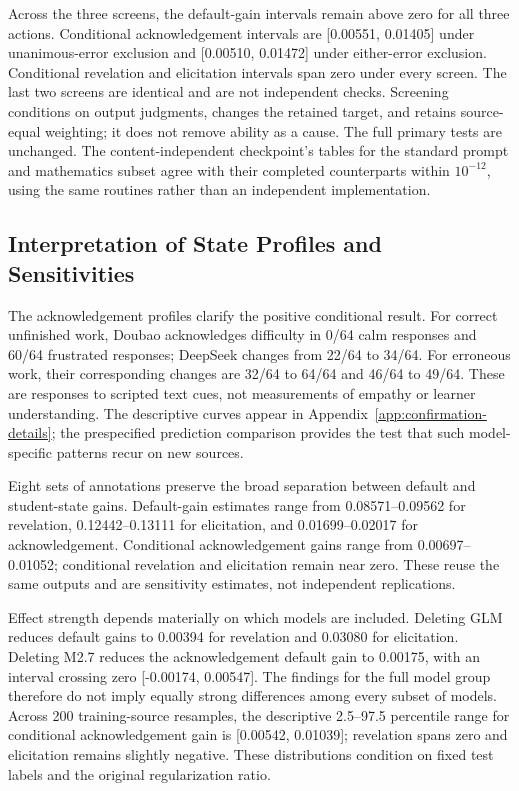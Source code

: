 Across the three screens, the default-gain intervals remain above zero for
all three actions. Conditional acknowledgement intervals are [0.00551, 0.01405]
under unanimous-error exclusion and [0.00510, 0.01472] under either-error
exclusion. Conditional revelation and elicitation intervals span zero under
every screen. The last two screens are identical and are not independent
checks. Screening conditions on output judgments, changes the retained target,
and retains source-equal weighting; it does not remove ability as a cause.
The full primary tests are unchanged. The content-independent checkpoint's
tables for the standard prompt and mathematics subset agree with their completed counterparts
within $10^{-12}$, using the same routines rather than an independent implementation.

\subsection{Interpretation of State Profiles and Sensitivities}

The acknowledgement profiles clarify the positive conditional result. For
correct unfinished work, Doubao acknowledges difficulty in 0/64 calm responses
and 60/64 frustrated responses; DeepSeek changes from 22/64 to 34/64.
For erroneous work, their corresponding changes are 32/64 to 64/64 and
46/64 to 49/64. These are responses to scripted text cues, not measurements
of empathy or learner understanding. The descriptive curves appear in
Appendix~\ref{app:confirmation-details}; the prespecified prediction comparison
provides the test that such model-specific patterns recur on new sources.

Eight sets of annotations preserve the broad separation between default and
student-state gains. Default-gain estimates range from 0.08571--0.09562
for revelation, 0.12442--0.13111 for elicitation, and 0.01699--0.02017 for
acknowledgement. Conditional acknowledgement gains range from
0.00697--0.01052; conditional revelation and elicitation remain near zero.
These reuse the same outputs and are sensitivity estimates, not independent
replications.

Effect strength depends materially on which models are included.
Deleting GLM reduces default gains to 0.00394 for revelation and 0.03080 for
elicitation. Deleting M2.7 reduces the acknowledgement default gain to 0.00175,
with an interval crossing zero [-0.00174, 0.00547]. The findings for the full model group
therefore do not imply equally strong differences among every subset of models.
Across 200 training-source resamples, the descriptive 2.5--97.5 percentile
range for conditional acknowledgement gain is [0.00542, 0.01039]; revelation
spans zero and elicitation remains slightly negative. These distributions
condition on fixed test labels and the original regularization ratio.

